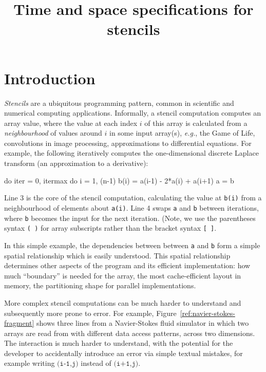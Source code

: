 \documentclass[9pt]{sigplanconf}
\title{Time and space specifications for stencils}
\theoremstyle{definition}
\newcommand{\eg}{\emph{e.g.}}
\begin{document}
\maketitle

\begin{abstract}
\end{abstract}



\section{Introduction}

\emph{Stencils} are a ubiquitous programming pattern, common in
scientific and numerical computing applications. Informally, a stencil
computation computes an array value, where the value at each index $i$ of
this array is calculated from a \emph{neighbourhood} of values around $i$ in
some input array(s), \eg{}, the Game of Life, convolutions in image
processing, approximations to differential equations. For example, the
following iteratively computes the one-dimensional discrete Laplace
transform (an approximation to a derivative): 
%
\begin{ExmVerbatim}
do iter = 0, itermax
   do i = 1, (n-1)
      b(i) = a(i-1) - 2*a(i) + a(i+1)
   a = b
\end{ExmVerbatim}
%
Line 3 is the core of the stencil computation, calculating
the value at \texttt{b(i)} from a neighbourhood of elements about
\texttt{a(i)}. Line 4 swaps
\texttt{a} and \texttt{b} between iterations, where \texttt{b} becomes the
input for the next iteration. (Note, we use the parentheses syntax
\texttt{( )} for
array subscripts rather than the bracket syntax \texttt{[ ]}. 

In this simple example, the dependencies between between \texttt{a}
and \texttt{b} form a simple spatial relationship which is easily
understood. This spatial relationship determines other aspects of the
program and its efficient implementation: how much ``boundary'' is
needed for the array, the most cache-efficient layout in memory,
the partitioning shape for parallel implementations. 

More complex stencil computations can be much harder to understand and
subsequently more prone to error. For example,
Figure~\ref{ref:navier-stokes-fragment} shows three lines from a
Navier-Stokes fluid simulator in which two arrays are read from with
different data access patterns, across two dimensions. The interaction
is much harder to understand, with the potential for the developer to
accidentally introduce an error via simple textual mistakes, for
example writing $\texttt{(i-1,j)}$ instead of $\texttt{(i+1,j)}$.
\end{document}
